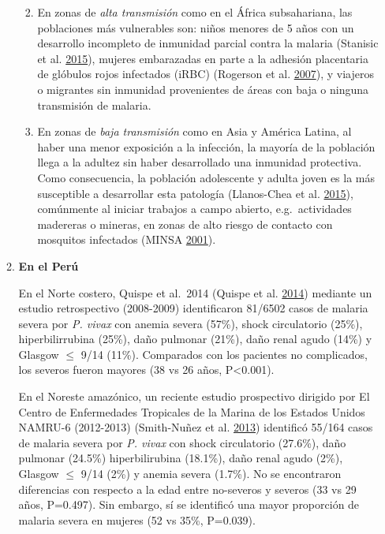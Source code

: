 \documentclass[
  a4paper]{article}
\providecommand{\tightlist}{%
  \setlength{\itemsep}{0pt}\setlength{\parskip}{0pt}}
\begin{document}
\begin{enumerate}
\begin{enumerate}
    \begin{enumerate}
    \def\labelenumiii{\arabic{enumiii}.}
    \tightlist
    \item
      En zonas de \emph{alta transmisión} como en el África
      subsahariana, las poblaciones más vulnerables son: niños menores
      de 5 años con un desarrollo incompleto de inmunidad parcial contra
      la malaria (Stanisic et al.
      \protect\hyperlink{ref-Stanisic2015}{2015}), mujeres embarazadas
      en parte a la adhesión placentaria de glóbulos rojos infectados
      (iRBC) (Rogerson et al.
      \protect\hyperlink{ref-rogerson2007preg}{2007}), y viajeros o
      migrantes sin inmunidad provenientes de áreas con baja o ninguna
      transmisión de malaria.
    \item
      En zonas de \emph{baja transmisión} como en Asia y América Latina,
      al haber una menor exposición a la infección, la mayoría de la
      población llega a la adultez sin haber desarrollado una inmunidad
      protectiva. Como consecuencia, la población adolescente y adulta
      joven es la más susceptible a desarrollar esta patología
      (Llanos-Chea et al. \protect\hyperlink{ref-llanoschea2015}{2015}),
      comúnmente al iniciar trabajos a campo abierto, e.g.~actividades
      madereras o mineras, en zonas de alto riesgo de contacto con
      mosquitos infectados (MINSA
      \protect\hyperlink{ref-factores2001}{2001}).
    \end{enumerate}
  \item
    \textbf{En el Perú}

    En el Norte costero, Quispe et al.~2014 (Quispe et al.
    \protect\hyperlink{ref-quispe2014}{2014}) mediante un estudio
    retrospectivo (2008-2009) identificaron 81/6502 casos de malaria
    severa por \emph{P. vivax} con anemia severa (57\%), shock
    circulatorio (25\%), hiperbilirrubina (25\%), daño pulmonar (21\%),
    daño renal agudo (14\%) y Glasgow \(\le\) 9/14 (11\%). Comparados
    con los pacientes no complicados, los severos fueron mayores (38 vs
    26 años, P\textless{}0.001).

    En el Noreste amazónico, un reciente estudio prospectivo dirigido
    por El Centro de Enfermedades Tropicales de la Marina de los Estados
    Unidos NAMRU-6 (2012-2013) (Smith-Nuñez et al.
    \protect\hyperlink{ref-smith2013}{2013}) identificó 55/164 casos de
    malaria severa por \emph{P. vivax} con shock circulatorio (27.6\%),
    daño pulmonar (24.5\%) hiperbilirubina (18.1\%), daño renal agudo
    (2\%), Glasgow \(\le\) 9/14 (2\%) y anemia severa (1.7\%). No se
    encontraron diferencias con respecto a la edad entre no-severos y
    severos (33 vs 29 años, P=0.497). Sin embargo, sí se identificó una
    mayor proporción de malaria severa en mujeres (52 vs 35\%, P=0.039).
  \end{enumerate}
\end{enumerate}
\end{document}
